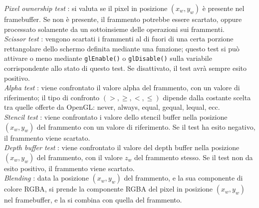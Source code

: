 \emph{Pixel ownership test} : si valuta se il pixel in posizione $(x_w,y_w)$ è presente nel framebuffer. Se non è presente, il frammento potrebbe essere scartato, oppure processato solamente da un sottoinsieme delle operazioni sui frammenti.
\\

\emph{Scissor test} : vengono scartati i frammenti al di fuori di una certa porzione rettangolare dello schermo definita mediante una funzione; questo test si può attivare o meno mediante \texttt{glEnable()} o \texttt{glDisable()} sulla variabile corrispondente allo stato di questo test. Se disattivato, il test avrà sempre esito positivo.
\\

\emph{Alpha test} : viene confrontato il valore alpha del frammento, con un valore di riferimento; il tipo di confronto $(>,\geq,<,\leq)$ dipende dalla costante scelta tra quelle offerte da OpenGL: never, always, equal, gequal, lequal, ecc.
\\

\emph{Stencil test} : viene confrontato i valore dello stencil buffer nella posizione $(x_w,y_w)$ del frammento con un valore di riferimento. Se il test ha esito negativo, il frammento viene scartato.
\\

\emph{Depth buffer test} : viene confrontato il valore del depth buffer nella posizione $(x_w,y_w)$ del frammento, con il valore $z_w$ del frammento stesso. Se il test non da esito positivo, il frammento viene scartato.
\\

\emph{Blending} : data la posizione $(x_w,y_w)$ del frammento, e la sua componente di colore RGBA, si prende la componente RGBA del pixel in posizione $(x_w,y_w)$ nel framebuffer, e la si combina con quella del frammento.
\\


